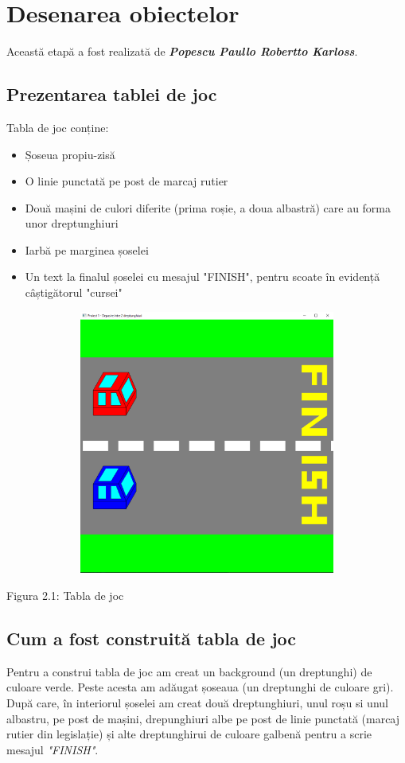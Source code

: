 \documentclass[12pt]{report}
\begin{document}
    \newpage
    \chapter{Desenarea obiectelor}
    Această etapă a fost realizată de \emph{\textbf{Popescu Paullo Robertto Karloss}}.
    \section{Prezentarea tablei de joc}
    Tabla de joc conține:
    \begin{itemize}
        \item Șoseua propiu-zisă
        \item O linie punctată pe post de marcaj rutier
        \item Două mașini de culori diferite (prima roșie, a doua albastră) care au forma unor dreptunghiuri
        \item Iarbă pe marginea șoselei
        \item Un text la finalul șoselei cu mesajul "FINISH", pentru scoate în evidență câștigătorul "cursei"
    \end{itemize}
    \begin{center}
        \includegraphics[width=15cm, height=8.7cm]{Poza1.png}
    \end{center}
    \begin{center}
        Figura 2.1: Tabla de joc
    \end{center}

    \section{Cum a fost construită tabla de joc}
    Pentru a construi tabla de joc am creat un background (un dreptunghi) de culoare verde.
    Peste acesta am adăugat șoseaua (un dreptunghi de culoare gri).
    După care, în interiorul șoselei am creat două dreptunghiuri, unul roșu si unul albastru, pe post de mașini, 
    drepunghiuri albe pe post de linie punctată (marcaj rutier din legislație) și alte dreptunghirui de culoare galbenă pentru a scrie mesajul \emph{"FINISH"}.
\end{document}
